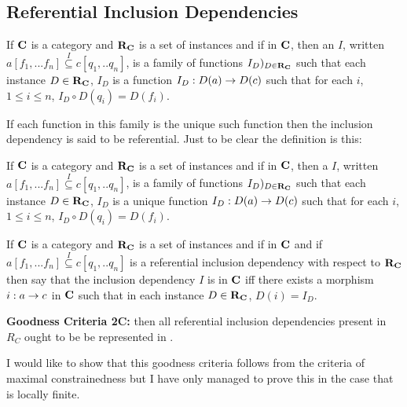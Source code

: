 \documentclass[xcolor=pst,dvips]{beamer}   %
\begin{document}
\subsection{Referential Inclusion Dependencies}
\begin{frame}
\begin{definition}
If $\textbf{C}$ is a category and $\textbf{R}_{\textbf{C}}$ is a set of instances 
and if
\fnsourceqnsource
in $\textbf{C}$, then an  $I$, written $a[f_1,...f_n] \overset{I}{\subseteq} c[q_1,..q_n]$, is a family of functions $I_D)_{D \in \textbf{R}_{\textbf{C}}}$
such that each instance $D \in \textbf{R}_{\textbf{C}}$, $I_D$ is a function $I_D : D(a) \rightarrow D(c)$ such that
for each $i$, $1 \leq i \le n$, $I_D \circ D(q_i) = D(f_i)$.
\end{definition}

If each function in this family is the unique such function then the inclusion dependency is said to be referential. Just to be clear the definition is this:
\end{frame}

\begin{frame}
\begin{definition}
If $\textbf{C}$ is a category and $\textbf{R}_{\textbf{C}}$ is a set of instances 
and if
\fnsourceqnsource
in $\textbf{C}$, then a  $I$, written $a[f_1,...f_n] \overset{I}{\subseteq} c[q_1,..q_n]$, is a family of functions $I_D)_{D \in \textbf{R}_{\textbf{C}}}$
such that each instance $D \in \textbf{R}_{\textbf{C}}$, $I_D$ is a unique function $I_D : D(a) \rightarrow D(c)$ such that
for each $i$, $1 \leq i \le n$, $I_D \circ D(q_i) = D(f_i)$.
\end{definition}
\end{frame}

\begin{frame}
\begin{definition}
If $\textbf{C}$ is a category and $\textbf{R}_{\textbf{C}}$ is a set of instances and if
\fnsourceqnsource
in $\textbf{C}$ and if $a[f_1,...f_n] \overset{I}{\subseteq} c[q_1,..q_n]$ is a referential inclusion dependency
with respect  to $\textbf{R}_{\textbf{C}}$ then say that the inclusion dependency $I$ is  in $\textbf{C}$
iff there exists a morphism $i:a \rightarrow c$ in $\textbf{C}$ such that in each instance $D \in \textbf{R}_{\textbf{C}}$, $D(i) = I_D$. 
\end{definition}
\end{frame}

\begin{frame}
\textbf {Goodness Criteria 2C:} \IfSforCwithRCwords 
then all referential inclusion dependencies present in $R_C$
ought to be be represented in \catc.

I would like to show that this goodness criteria follows from the criteria of maximal constrainedness
but I have only managed to prove this in the case that \catcw is locally finite.
\end{frame}
\end{document}
